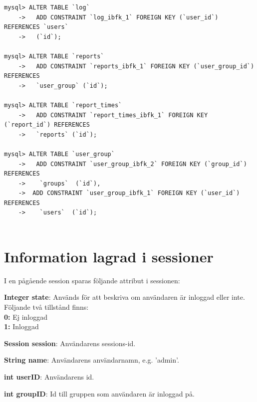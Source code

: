 \documentclass[a4paper]{article}
\begin{document}
\begin{lstlisting}
mysql> ALTER TABLE `log`
    ->   ADD CONSTRAINT `log_ibfk_1` FOREIGN KEY (`user_id`) REFERENCES `users`
    ->   (`id`);

mysql> ALTER TABLE `reports`
    ->   ADD CONSTRAINT `reports_ibfk_1` FOREIGN KEY (`user_group_id`) REFERENCES
    ->   `user_group` (`id`);

mysql> ALTER TABLE `report_times`
    ->   ADD CONSTRAINT `report_times_ibfk_1` FOREIGN KEY (`report_id`) REFERENCES
    ->   `reports` (`id`);

mysql> ALTER TABLE `user_group`
    ->   ADD CONSTRAINT `user_group_ibfk_2` FOREIGN KEY (`group_id`) REFERENCES
    ->    `groups`  (`id`),
    ->  ADD CONSTRAINT `user_group_ibfk_1` FOREIGN KEY (`user_id`) REFERENCES
    ->    `users`  (`id`);
  
\end{lstlisting}


\section{Information lagrad i sessioner}
I en pågående session sparas följande attribut i sessionen:

\vspace{5mm}
\begin{hangparas}{1.5em}{1}
\textbf{Integer state}: Används för att beskriva om användaren är inloggad eller inte. Följande två tillstånd finns:\\
\textbf{0:} Ej inloggad\\
\textbf{1:} Inloggad
\end{hangparas}

\vspace{5mm}
\begin{hangparas}{1.5em}{1}
\textbf{Session session}: Användarens sessions-id.
\end{hangparas}

\vspace{5mm}
\begin{hangparas}{1.5em}{1}
\textbf{String name}: Användarens användarnamn, e.g. 'admin'. 
\end{hangparas}

\vspace{5mm}
\begin{hangparas}{1.5em}{1}
\textbf{int userID}: Användarens id. 
\end{hangparas}

\vspace{5mm}
\begin{hangparas}{1.5em}{1}
\textbf{int groupID}: Id till gruppen som användaren är inloggad på. 
\end{hangparas}
\end{document}
